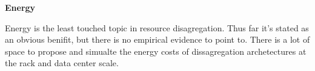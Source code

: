 \textbf{Energy}

Energy is the least touched topic in resource disagregation. Thus far it's
stated as an obvious benifit, but there is no empirical evidence to point to.
There is a lot of space to propose and simualte the energy costs of
dissagregation archetectures at the rack and data center scale.

